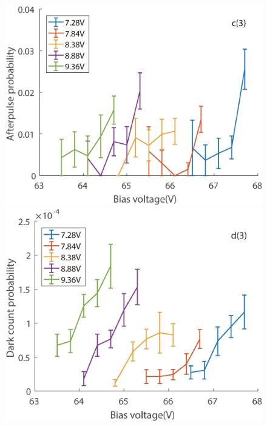 \documentclass[%
 reprint,
superscriptaddress,
 amsmath,amssymb,
 aps,
]{revtex4-1}
\begin{document}
\begin{figure}
\begin{minipage}{0.24\linewidth}
\includegraphics[width = 1\textwidth]{figure/100M/afterpulse1.eps}%
\end{minipage}
\begin{minipage}{0.24\linewidth}
\centering
\includegraphics[width = 1\textwidth]{figure/100M/darkcount.eps}%
\end{minipage}


\end{figure}
\end{document}
